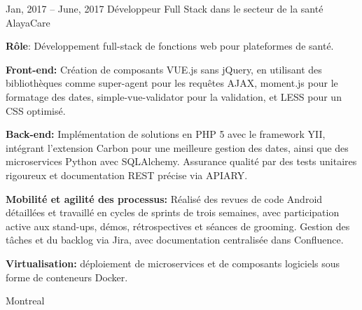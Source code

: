 \documentclass[
  a4paper,
   maincolor=cvblue,
   sectioncolor=cvblue,
   sidebarwidth=0.323\paperwidth,
]{fortysecondscv}
\begin{document}
\begin{cvtableNew}
  \cvitemRightNew
    {Jan, 2017 – June, 2017} %
    {Développeur Full Stack dans le secteur de la santé} %
    {AlayaCare} %
    {
      \vspace{0.1pt} %
      \fontsize{10.8pt}{12pt}\selectfont %
      \textbf{Rôle}: Développement full-stack de fonctions web pour plateformes de santé.\par
      \vspace{4pt}
      \textbf{Front-end:} Création de composants VUE.js sans jQuery, en utilisant des bibliothèques comme super-agent pour les requêtes AJAX, moment.js pour le formatage des dates, simple-vue-validator pour la validation, et LESS pour un CSS optimisé.\par
      \vspace{4pt}
      \textbf{Back-end:} Implémentation de solutions en PHP 5 avec le framework YII, intégrant l’extension Carbon pour une meilleure gestion des dates, ainsi que des microservices Python avec SQLAlchemy. Assurance qualité par des tests unitaires rigoureux et documentation REST précise via APIARY.\par
      \vspace{4pt}
      \textbf{Mobilité et agilité des processus:} Réalisé des revues de code Android détaillées et travaillé en cycles de sprints de trois semaines, avec participation active aux stand-ups, démos, rétrospectives et séances de grooming. Gestion des tâches et du backlog via Jira, avec documentation centralisée dans Confluence.\par
      \vspace{4pt}
      \textbf{Virtualisation:} déploiement de microservices et de composants logiciels sous forme de conteneurs Docker.\par
    }
    {Montreal} %

\vspace{2.2mm} %


\end{cvtableNew}
\end{document}
